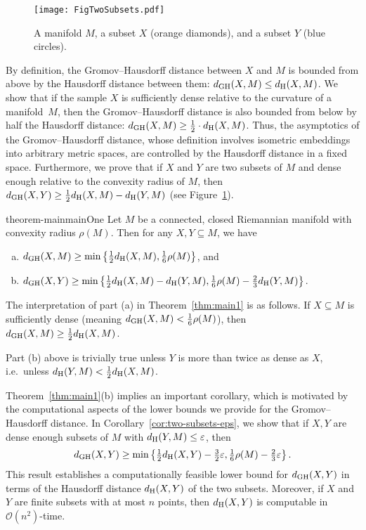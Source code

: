 \documentclass[11pt, reqno, english]{amsart}
\begin{document}
\begin{figure}[htb]
\centering
\texttt{[image: FigTwoSubsets.pdf]}
\caption{A manifold $M$, a subset $X$ (orange diamonds), and a subset $Y$ (blue circles).}
\label{fig:two-subsets}
\end{figure}

By definition, the Gromov--Hausdorff distance between $X$ and $M$ is bounded from above by the Hausdorff distance between them: $d_{\mathrm{GH}}(X,M) \le
d_{\mathrm{H}}(X,M)$.
We show that if the sample $X$ is sufficiently dense relative to the curvature of a manifold~$M$, then the Gromov--Hausdorff distance is also bounded from below by half the Hausdorff distance: $d_{\mathrm{GH}}(X,M) \ge
\frac{1}{2} \cdot d_{\mathrm{H}}(X,M)$. 
Thus, the asymptotics of the Gromov--Hausdorff distance, whose definition involves isometric embeddings into arbitrary metric spaces, are controlled by the Hausdorff distance in a fixed space.
Furthermore, we prove that if $X$ and $Y$ are two subsets of $M$ and dense enough relative to the convexity radius of $M$, then $d_{\mathrm{GH}}(X,Y) \ge \frac{1}{2}d_{\mathrm{H}}(X,M)-d_{\mathrm{H}}(Y,M)$ (see Figure~\ref{fig:two-subsets}).

\vspace{3mm}
\begin{restatable}{theorem-main}{mainOne}
\label{thm:main1}
Let $M$ be a connected, closed Riemannian manifold with convexity radius $\rho(M)$.
Then for any $X,Y\subseteq M$, we have
\begin{enumerate}[(a)]
\item $d_{\mathrm{GH}}(X,M) \ge \min\left\{\tfrac{1}{2}d_{\mathrm{H}}(X,M), \tfrac{1}{6}\rho(M)\right\}$, and
\item $d_{\mathrm{GH}}(X,Y) \ge \min\left\{\tfrac{1}{2}d_{\mathrm{H}}(X,M)-d_{\mathrm{H}}(Y,M), \tfrac{1}{6}\rho(M)-\frac{2}{3}d_{\mathrm{H}}(Y,M)\right\}$.
\end{enumerate}
\end{restatable}
\vspace{3mm}

The interpretation of part (a) in Theorem~\ref{thm:main1} is as follows.
If $X\subseteq M$ is sufficiently dense (meaning $d_{\mathrm{GH}}(X,M)<\tfrac{1}{6}\rho(M)$), then $d_{\mathrm{GH}}(X,M) \ge \tfrac{1}{2}d_{\mathrm{H}}(X,M)$.

Part (b) above is trivially true unless $Y$ is more than twice as dense as $X$, i.e.\ unless $d_{\mathrm{H}}(Y,M)< \frac{1}{2}d_{\mathrm{H}}(X,M)$. 

Theorem~\ref{thm:main1}(b) implies an important corollary, which is motivated by the computational aspects of the lower bounds we provide for the Gromov--Hausdorff distance.
In Corollary~\ref{cor:two-subsets-eps}, we show that if $X, Y$ are dense enough subsets of $M$ with $d_{\mathrm{H}}(Y,M)\le\varepsilon$, then 
\[
d_{\mathrm{GH}}(X,Y) \ge \min\left\{\tfrac{1}{2}d_{\mathrm{H}}(X,Y)-\tfrac{3}{2}\varepsilon, \tfrac{1}{6}\rho(M)-\tfrac{2}{3}\varepsilon\right\}.
\]
This result establishes a computationally feasible lower bound for $d_{\mathrm{GH}}(X,Y)$ in terms of the Hausdorff distance $d_{\mathrm{H}}(X,Y)$ of the two subsets.
Moreover, if  $X$ and $Y$ are finite subsets with at most $n$ points, then $d_{\mathrm{H}}(X,Y)$ is computable in $\mathcal{O}(n^2)$-time.
\end{document}
